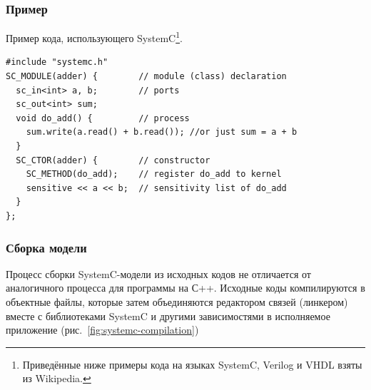 \subsubsection{Пример}

Пример кода, использующего SystemC\footnote{Приведённые ниже примеры кода на языках SystemC, Verilog  и VHDL взяты из Wikipedia.}.

\begin{lstlisting}
#include "systemc.h"
SC_MODULE(adder) {        // module (class) declaration
  sc_in<int> a, b;        // ports
  sc_out<int> sum;
  void do_add() {         // process
    sum.write(a.read() + b.read()); //or just sum = a + b
  }
  SC_CTOR(adder) {        // constructor
    SC_METHOD(do_add);    // register do_add to kernel
    sensitive << a << b;  // sensitivity list of do_add
  }
};
\end{lstlisting} 

\subsubsection{Сборка модели}

Процесс сборки SystemC-модели из исходных кодов не отличается от аналогичного процесса для программы на С++. Исходные коды компилируются в объектные файлы, которые затем объединяются редактором связей (линкером) вместе с библиотеками SystemC и другими зависимостями в исполняемое приложение (рис.~\ref{fig:systemc-compilation})

